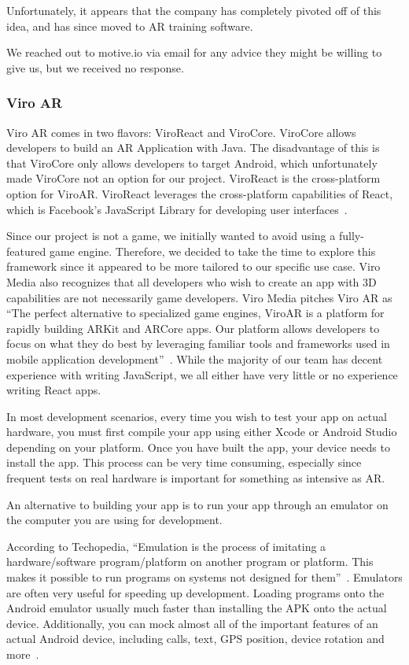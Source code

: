 \documentclass[a4paper, 10pt, american, titlepage]{article}
\begin{document}
Unfortunately, it appears that the company has completely pivoted off of this
idea, and has since moved to AR training software\autocite{motiveio}.

We reached out to motive.io via email for any advice they might be willing to
give us, but we received no response.

\subsubsection{Viro AR}
\label{sec:viroAR}

Viro AR comes in two flavors: ViroReact and ViroCore. ViroCore allows
developers to build an AR Application with Java. The disadvantage of this is
that ViroCore only allows developers to target Android, which unfortunately
made ViroCore not an option for our project. ViroReact is the cross-platform
option for ViroAR. ViroReact leverages the cross-platform capabilities of
React, which is Facebook's JavaScript Library for developing user
interfaces~\autocite{facebook2019}.

Since our project is not a game, we initially wanted to avoid using a
fully-featured game engine. Therefore, we decided to take the time to explore
this framework since it appeared to be more tailored to our specific use case.
Viro Media also recognizes that all developers who wish to create an app with
3D capabilities are not necessarily game developers. Viro Media pitches Viro
AR as ``The perfect alternative to specialized game engines, ViroAR is a
platform for rapidly building ARKit and ARCore apps. Our platform allows
developers to focus on what they do best by leveraging familiar tools and
frameworks used in mobile application development''~\autocite{viro2019}.
While the majority of our team has decent experience with writing JavaScript,
we all either have very little or no experience writing React apps.

In most development scenarios, every time you wish to test your app on actual
hardware, you must first compile your app using either Xcode or Android Studio
depending on your platform. Once you have built the app, your device needs to
install the app. This process can be very time consuming, especially since
frequent tests on real hardware is important for something as intensive as
AR.

An alternative to building your app is to run your app through an emulator on
the computer you are using for development.

According to Techopedia, ``Emulation is the process of imitating a
hardware/software program/platform on another program or platform. This makes
it possible to run programs on systems not designed for
them''~\autocite{techopedia2019}. Emulators are often very useful for speeding
up development. Loading programs onto the Android emulator usually much faster
than installing the APK onto the actual device. Additionally, you can mock
almost all of the important features of an actual Android device, including
calls, text, GPS position, device rotation and more~\autocite{androidemulator}.
\end{document}
